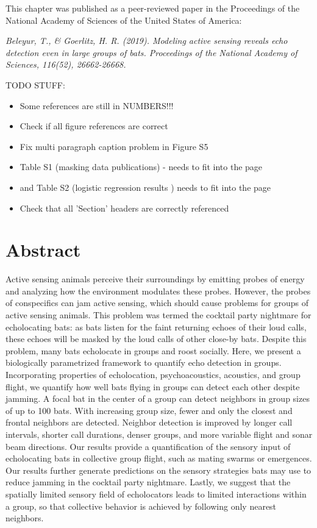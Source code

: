 \documentclass[
]{book}
\begin{document}
This chapter was published as a peer-reviewed paper in the Proceedings of the National Academy of Sciences of the United States of America:

\emph{Beleyur, T., \& Goerlitz, H. R. (2019). Modeling active sensing reveals echo detection even in large groups of bats. Proceedings of the National Academy of Sciences, 116(52), 26662-26668.}

TODO STUFF:

\begin{itemize}
\item Some references are still in NUMBERS!!!
\item Check if all figure references are correct
\item Fix multi  paragraph caption problem in Figure S5
\item Table S1 (masking data publications) - needs to fit into the page
\item and Table S2 (logistic regression results ) needs to fit into the page 
\item Check that all 'Section' headers are correctly referenced
\end{itemize}

\newpage

\hypertarget{cpn_abstract}{%
\section*{Abstract}\label{cpn_abstract}}

Active sensing animals perceive their surroundings by emitting probes of energy and analyzing how the environment modulates these probes. However, the probes of conspecifics can jam active sensing, which should cause problems for groups of active sensing animals. This problem was termed the cocktail party nightmare for echolocating bats: as bats listen for the faint returning echoes of their loud calls, these echoes will be masked by the loud calls of other close-by bats. Despite this problem, many bats echolocate in groups and roost socially. Here, we present a biologically parametrized framework to quantify echo detection in groups. Incorporating properties of echolocation, psychoacoustics, acoustics, and group flight, we quantify how well bats flying in groups can detect each other despite jamming. A focal bat in the center of a group can detect neighbors in group sizes of up to 100 bats. With increasing group size, fewer and only the closest and frontal neighbors are detected. Neighbor detection is improved by longer call intervals, shorter call durations, denser groups, and more variable flight and sonar beam directions. Our results provide a quantification of the sensory input of echolocating bats in collective group flight, such as mating swarms or emergences. Our results further generate predictions on the sensory strategies bats may use to reduce jamming in the cocktail party nightmare. Lastly, we suggest that the spatially limited sensory field of echolocators leads to limited interactions within a group, so that collective behavior is achieved by following only nearest neighbors.
\end{document}
